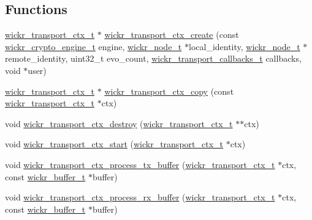 \subsection*{Functions}
\begin{DoxyCompactItemize}
\item 
\hyperlink{structwickr__transport__ctx}{wickr\+\_\+transport\+\_\+ctx\+\_\+t} $\ast$ \hyperlink{group__wickr__transport__ctx_ga4731758cf20b71d4469c74904bf662c0}{wickr\+\_\+transport\+\_\+ctx\+\_\+create} (const \hyperlink{structwickr__crypto__engine}{wickr\+\_\+crypto\+\_\+engine\+\_\+t} engine, \hyperlink{structwickr__node}{wickr\+\_\+node\+\_\+t} $\ast$local\+\_\+identity, \hyperlink{structwickr__node}{wickr\+\_\+node\+\_\+t} $\ast$remote\+\_\+identity, uint32\+\_\+t evo\+\_\+count, \hyperlink{structwickr__transport__callbacks}{wickr\+\_\+transport\+\_\+callbacks\+\_\+t} callbacks, void $\ast$user)
\item 
\hyperlink{structwickr__transport__ctx}{wickr\+\_\+transport\+\_\+ctx\+\_\+t} $\ast$ \hyperlink{group__wickr__transport__ctx_gaa49b2cf44bcb02d656598a17e5ae1c52}{wickr\+\_\+transport\+\_\+ctx\+\_\+copy} (const \hyperlink{structwickr__transport__ctx}{wickr\+\_\+transport\+\_\+ctx\+\_\+t} $\ast$ctx)
\item 
void \hyperlink{group__wickr__transport__ctx_gabe547b01f4f02efea3f518d7445a71ee}{wickr\+\_\+transport\+\_\+ctx\+\_\+destroy} (\hyperlink{structwickr__transport__ctx}{wickr\+\_\+transport\+\_\+ctx\+\_\+t} $\ast$$\ast$ctx)
\item 
void \hyperlink{group__wickr__transport__ctx_gaee74761e31d5f0a6fc97e2ccf5ac1e29}{wickr\+\_\+transport\+\_\+ctx\+\_\+start} (\hyperlink{structwickr__transport__ctx}{wickr\+\_\+transport\+\_\+ctx\+\_\+t} $\ast$ctx)
\item 
void \hyperlink{group__wickr__transport__ctx_gad9d2f86832cfb9c1948ba679fabbedbc}{wickr\+\_\+transport\+\_\+ctx\+\_\+process\+\_\+tx\+\_\+buffer} (\hyperlink{structwickr__transport__ctx}{wickr\+\_\+transport\+\_\+ctx\+\_\+t} $\ast$ctx, const \hyperlink{structwickr__buffer}{wickr\+\_\+buffer\+\_\+t} $\ast$buffer)
\item 
void \hyperlink{group__wickr__transport__ctx_gad982fd3463a81a667592e18d7bf90822}{wickr\+\_\+transport\+\_\+ctx\+\_\+process\+\_\+rx\+\_\+buffer} (\hyperlink{structwickr__transport__ctx}{wickr\+\_\+transport\+\_\+ctx\+\_\+t} $\ast$ctx, const \hyperlink{structwickr__buffer}{wickr\+\_\+buffer\+\_\+t} $\ast$buffer)
\end{DoxyCompactItemize}


